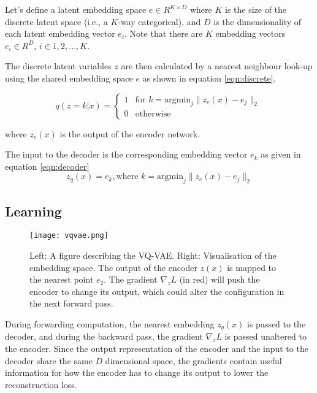 Let's define a latent embedding space $e \in R^{K \times D}$ where $K$ is the size of the discrete latent space 
(i.e., a $K$-way categorical), and $D$ is the dimensionality of each latent embedding vector $e_{i}$.
Note that there are $K$ embedding vectors $e_{i} \in R ^D$, $i\in{1, 2, ..., K}$.

The discrete latent variables $z$ are then calculated by a nearest 
neighbour look-up using the shared embedding space $e$ as shown in equation \ref{eqn:discrete}.

\begin{equation}
q(z = k|x) =
\begin{cases}
    1 & \text{for } k = \text{argmin}_{j} \| z_{e}(x) - e_{j} \|_{2} \\
    0 & \text{otherwise}
\end{cases}
\label{eqn:discrete}
\end{equation} 

where $z _e(x)$ is the output of the encoder network.

The input to the decoder is the corresponding embedding vector $e _k$ as given in equation \ref{eqn:decoder}
\begin{equation}
    z _q(x) = e _k, \text{where } k= \text{argmin} _j \| z _e(x) - e _j \| _2
    \label{eqn:decoder}
\end{equation}

\subsection{Learning}

\begin{figure}[h]
    \begin{center}
        \texttt{[image: vqvae.png]}
    \end{center}
    \caption{Left: A figure describing the VQ-VAE. Right: Visualisation of the embedding space. The
    output of the encoder $z(x)$ is mapped to the nearest point $e _2$. The gradient $\nabla _z L$ (in red) will push the
    encoder to change its output, which could alter the configuration in the next forward pass.}
    \label{fig:vqvae}
\end{figure}

During forwarding computation, the nearest embedding $z _q(x)$ is passed to the decoder,
and during the backward pass, the gradient $\nabla _z L$ is passed unaltered to the encoder. 
Since the output representation of the encoder and the input to the decoder share the same $D$
dimensional space, the gradients contain useful information for how the encoder has to change its 
output to lower the reconstruction loss.

